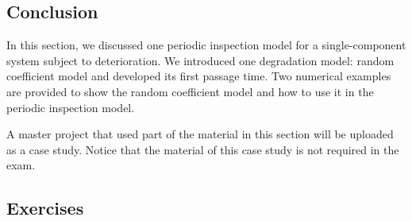 \documentclass[10pt,a4paper]{article}
\theoremstyle{remark}
\begin{document}
\subsection{Conclusion}
In this section, we discussed one periodic inspection model for a single-component system subject to deterioration. We introduced one degradation model: random coefficient model and developed its first passage time. Two numerical examples are provided to show the random coefficient model and how to use it in the periodic inspection model.

A master project that used part of the material in this section will be uploaded as a case study. Notice that the material of this case study is not required in the exam.
\subsection{Exercises}
\end{document}
